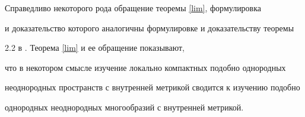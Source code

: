\begin{notes}


Справедливо некоторого рода обращение теоремы \ref{lim}, формулировка


и доказательство которого аналогичны формулировке и доказательству теоремы


2.2 в \cite{B3}. Теорема \ref{lim} и ее обращение показывают,


что в некотором смысле изучение локально компактных подобно однородных


неоднородных пространств с внутренней метрикой сводится к изучению подобно


однородных неоднородных многообразий с внутренней метрикой.


\end{notes}





